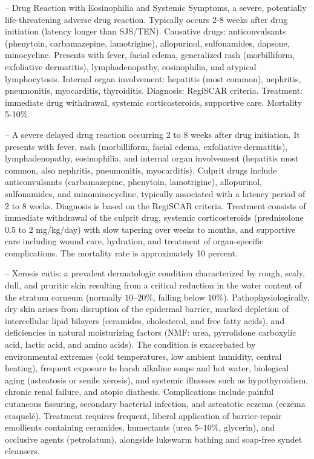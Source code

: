 -- Drug Reaction with Eosinophilia and Systemic Symptoms, a severe, potentially life-threatening adverse drug reaction. Typically occurs 2-8 weeks after drug initiation (latency longer than SJS/TEN). Causative drugs: anticonvulsants (phenytoin, carbamazepine, lamotrigine), allopurinol, sulfonamides, dapsone, minocycline. Presents with fever, facial edema, generalized rash (morbilliform, exfoliative dermatitis), lymphadenopathy, eosinophilia, and atypical lymphocytosis. Internal organ involvement: hepatitis (most common), nephritis, pneumonitis, myocarditis, thyroiditis. Diagnosis: RegiSCAR criteria. Treatment: immediate drug withdrawal, systemic corticosteroids, supportive care. Mortality 5-10\%.

-- A severe delayed drug reaction occurring 2 to 8 weeks after drug initiation. It presents with fever, rash (morbilliform, facial edema, exfoliative dermatitis), lymphadenopathy, eosinophilia, and internal organ involvement (hepatitis most common, also nephritis, pneumonitis, myocarditis). Culprit drugs include anticonvulsants (carbamazepine, phenytoin, lamotrigine), allopurinol, sulfonamides, and minominocycline, typically associated with a latency period of 2 to 8 weeks. Diagnosis is based on the RegiSCAR criteria. Treatment consists of immediate withdrawal of the culprit drug, systemic corticosteroids (prednisolone 0.5 to 2 mg/kg/day) with slow tapering over weeks to months, and supportive care including wound care, hydration, and treatment of organ-specific complications. The mortality rate is approximately 10 percent.

-- Xerosis cutis; a prevalent dermatologic condition characterized by rough, scaly, dull, and pruritic skin resulting from a critical reduction in the water content of the stratum corneum (normally $10\text{--}20\%$, falling below $10\%$). Pathophysiologically, dry skin arises from disruption of the epidermal barrier, marked depletion of intercellular lipid bilayers (ceramides, cholesterol, and free fatty acids), and deficiencies in natural moisturizing factors (NMF: urea, pyrrolidone carboxylic acid, lactic acid, and amino acids). The condition is exacerbated by environmental extremes (cold temperatures, low ambient humidity, central heating), frequent exposure to harsh alkaline soaps and hot water, biological aging (asteatosis or senile xerosis), and systemic illnesses such as hypothyroidism, chronic renal failure, and atopic diathesis. Complications include painful cutaneous fissuring, secondary bacterial infection, and asteatotic eczema (eczema craquelé). Treatment requires frequent, liberal application of barrier-repair emollients containing ceramides, humectants (urea $5\text{--}10\%$, glycerin), and occlusive agents (petrolatum), alongside lukewarm bathing and soap-free syndet cleansers.

